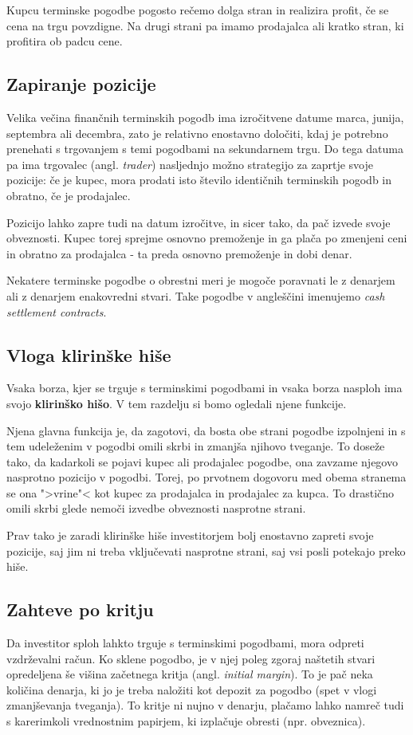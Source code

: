 \documentclass[a4paper, 12pt]{article}
\begin{document}
Kupcu terminske pogodbe pogosto rečemo dolga stran in realizira profit, če se cena na trgu 
povzdigne. Na drugi strani pa imamo prodajalca ali kratko stran, ki profitira ob padcu cene.

\subsection{Zapiranje pozicije}
Velika večina finančnih terminskih pogodb ima izročitvene datume marca, junija, septembra ali 
decembra, zato je relativno enostavno določiti, kdaj je potrebno prenehati s trgovanjem s temi 
pogodbami na sekundarnem trgu. Do tega datuma pa ima trgovalec (angl. \textit{trader}) nasljednjo
možno strategijo za zaprtje svoje pozicije: če je kupec, mora prodati isto število identičnih
terminskih pogodb in obratno, če je prodajalec.

Pozicijo lahko zapre tudi na datum izročitve, in sicer tako, da pač izvede svoje obveznosti. 
Kupec torej sprejme osnovno premoženje in ga plača po zmenjeni ceni in obratno za prodajalca - 
ta preda osnovno premoženje in dobi denar. 

Nekatere terminske pogodbe o obrestni meri je mogoče poravnati le z denarjem ali z denarjem 
enakovredni stvari. Take pogodbe v angleščini imenujemo \textit{cash settlement contracts}.

\subsection{Vloga klirinške hiše}
Vsaka borza, kjer se trguje s terminskimi pogodbami in vsaka borza nasploh ima svojo \textbf{
klirinško hišo}. V tem razdelju si bomo ogledali njene funkcije.

Njena glavna funkcija je, da zagotovi, da bosta obe strani pogodbe izpolnjeni in s tem 
udeleženim v pogodbi omili skrbi in zmanjša njihovo tveganje. To doseže tako, da kadarkoli
se pojavi kupec ali prodajalec pogodbe, ona zavzame njegovo nasprotno pozicijo v pogodbi.
Torej, po prvotnem dogovoru med obema stranema se ona ">vrine"< kot kupec za prodajalca in 
prodajalec za kupca. To drastično omili skrbi glede nemoči izvedbe obveznosti nasprotne
strani. 

Prav tako je zaradi klirinške hiše investitorjem bolj enostavno zapreti svoje pozicije, saj 
jim ni treba vključevati nasprotne strani, saj vsi posli potekajo preko hiše. 

\subsection{Zahteve po kritju}
Da investitor sploh lahkto trguje s terminskimi pogodbami, mora odpreti vzdrževalni račun. 
Ko sklene pogodbo, je v njej poleg zgoraj naštetih stvari opredeljena še višina začetnega 
kritja (angl. \textit{initial margin}). To je pač neka količina denarja, ki jo je treba 
naložiti kot depozit za pogodbo (spet v vlogi zmanjševanja tveganja). To kritje ni nujno
v denarju, plačamo lahko namreč tudi s karerimkoli vrednostnim papirjem, ki izplačuje obresti
(npr. obveznica).
\end{document}
